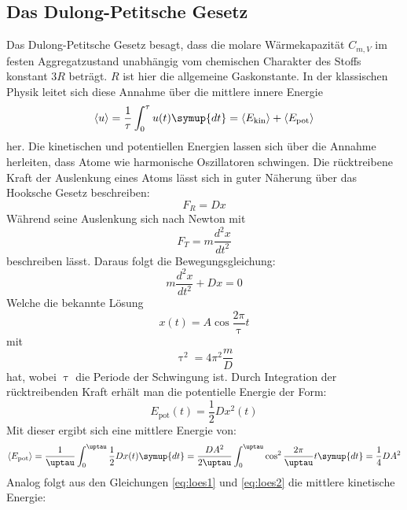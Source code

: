 \subsection{Das Dulong-Petitsche Gesetz}
Das Dulong-Petitsche Gesetz besagt, dass die molare Wärmekapazität $C_{m,V}$ im festen Aggregatzustand
unabhängig vom chemischen Charakter des Stoffs konstant $3R$ beträgt.
$R$ ist hier die allgemeine Gaskonstante.
In der klassischen Physik leitet sich diese Annahme über die mittlere innere Energie
 \begin{equation}
 \langle u \rangle = \frac{1}{\tau} \int_0^\tau u(t)\symup{dt} = \langle E_\text{kin} \rangle + \langle
E_\text{pot} \rangle
 \end{equation}
her.
Die kinetischen und potentiellen Energien lassen sich über die Annahme herleiten, dass Atome
wie harmonische Oszillatoren schwingen.
Die rücktreibene Kraft der Auslenkung eines Atoms lässt sich in guter Näherung über das Hooksche Gesetz beschreiben:
\begin{equation}
  F_R= Dx
\end{equation}
Während seine Auslenkung sich nach Newton mit
\begin{equation}
  F_T=   m \frac{d^2 x}{dt^2}
\end{equation}
beschreiben lässt.
Daraus folgt die Bewegungsgleichung:
\begin{equation}
  m \frac{d^2 x}{dt^2}+Dx=0 
\end{equation}
Welche die bekannte Lösung
\begin{equation}
  \label{eq:loes1}
  x(t)=A \cos{\frac{2\pi}{\uptau}t}
\end{equation}
mit
\begin{equation}
  \label{eq:loes2}
  \uptau^2 = 4 \pi^2 \frac{m}{D}
\end{equation}
hat, wobei $\uptau$ die Periode der Schwingung ist.
Durch Integration der rücktreibenden Kraft erhält man die potentielle Energie der Form:
\begin{equation}
  E_\text{pot}(t) = \frac{1}{2}Dx^2(t)
\end{equation}
Mit dieser ergibt sich eine mittlere Energie von:
\begin{equation}
  \langle E_\text{pot} \rangle = \frac{1}{\uptau} \int_0^\uptau \frac{1}{2}Dx(t)\symup{dt}=\frac{DA^2}{2\uptau}\int_0^\uptau \cos^2{\frac{2\pi}{\uptau}t}\symup{dt} =\frac{1}{4}DA^2
\end{equation}
Analog folgt aus den Gleichungen \eqref{eq:loes1} und \eqref{eq:loes2} die mittlere kinetische Energie:
